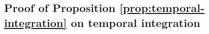 \documentclass[journal]{IEEEtran}
\theoremstyle{remark}
\begin{document}

\subsection{Proof of Proposition \ref{prop:temporal-integration} on temporal integration}
\end{document}
